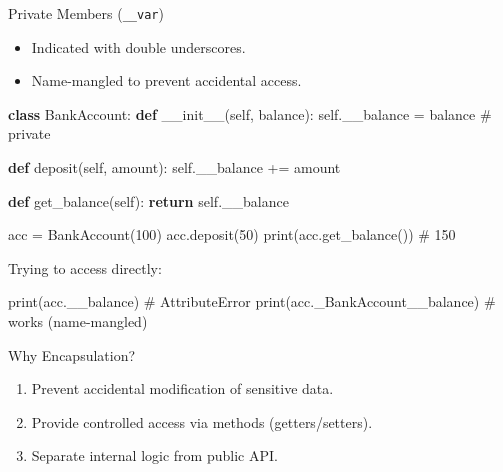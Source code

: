 \documentclass[
  letterpaper,
  DIV=11,
  numbers=noendperiod]{scrreprt}
\newenvironment{Shaded}{\begin{snugshade}}{\end{snugshade}}
\newcommand{\BuiltInTok}[1]{\textcolor[rgb]{0.00,0.23,0.31}{#1}}
\newcommand{\CommentTok}[1]{\textcolor[rgb]{0.37,0.37,0.37}{#1}}
\newcommand{\ControlFlowTok}[1]{\textcolor[rgb]{0.00,0.23,0.31}{\textbf{#1}}}
\newcommand{\DecValTok}[1]{\textcolor[rgb]{0.68,0.00,0.00}{#1}}
\newcommand{\FunctionTok}[1]{\textcolor[rgb]{0.28,0.35,0.67}{#1}}
\newcommand{\KeywordTok}[1]{\textcolor[rgb]{0.00,0.23,0.31}{\textbf{#1}}}
\newcommand{\NormalTok}[1]{\textcolor[rgb]{0.00,0.23,0.31}{#1}}
\newcommand{\OperatorTok}[1]{\textcolor[rgb]{0.37,0.37,0.37}{#1}}
\newcommand{\VariableTok}[1]{\textcolor[rgb]{0.07,0.07,0.07}{#1}}
\providecommand{\tightlist}{%
  \setlength{\itemsep}{0pt}\setlength{\parskip}{0pt}}
\begin{document}
Private Members (\texttt{\_\_var})

\begin{itemize}
\tightlist
\item
  Indicated with double underscores.
\item
  Name-mangled to prevent accidental access.
\end{itemize}

\begin{Shaded}
\begin{Highlighting}[]
\KeywordTok{class}\NormalTok{ BankAccount:}
    \KeywordTok{def} \FunctionTok{\_\_init\_\_}\NormalTok{(}\VariableTok{self}\NormalTok{, balance):}
        \VariableTok{self}\NormalTok{.\_\_balance }\OperatorTok{=}\NormalTok{ balance   }\CommentTok{\# private}

    \KeywordTok{def}\NormalTok{ deposit(}\VariableTok{self}\NormalTok{, amount):}
        \VariableTok{self}\NormalTok{.\_\_balance }\OperatorTok{+=}\NormalTok{ amount}

    \KeywordTok{def}\NormalTok{ get\_balance(}\VariableTok{self}\NormalTok{):}
        \ControlFlowTok{return} \VariableTok{self}\NormalTok{.\_\_balance}

\NormalTok{acc }\OperatorTok{=}\NormalTok{ BankAccount(}\DecValTok{100}\NormalTok{)}
\NormalTok{acc.deposit(}\DecValTok{50}\NormalTok{)}
\BuiltInTok{print}\NormalTok{(acc.get\_balance())   }\CommentTok{\# 150}
\end{Highlighting}
\end{Shaded}

Trying to access directly:

\begin{Shaded}
\begin{Highlighting}[]
\BuiltInTok{print}\NormalTok{(acc.\_\_balance)   }\CommentTok{\# AttributeError}
\BuiltInTok{print}\NormalTok{(acc.\_BankAccount\_\_balance)   }\CommentTok{\# works (name{-}mangled)}
\end{Highlighting}
\end{Shaded}

Why Encapsulation?

\begin{enumerate}
\def\labelenumi{\arabic{enumi}.}
\tightlist
\item
  Prevent accidental modification of sensitive data.
\item
  Provide controlled access via methods (getters/setters).
\item
  Separate internal logic from public API.
\end{enumerate}
\end{document}
